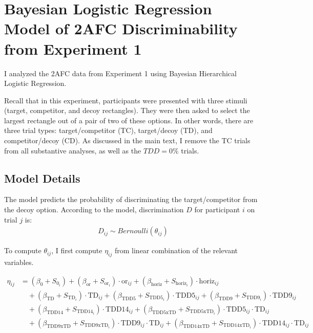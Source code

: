 \chapter{Bayesian Logistic Regression Model of 2AFC Discriminability from Experiment 1}
I analyzed the 2AFC data from Experiment 1 using Bayesian Hierarchical Logistic Regression. 

Recall that in this experiment, participants were presented with three stimuli (target, competitor, and decoy rectangles). They were then asked to select the largest rectangle out of a pair of two of these options. In other words, there are three trial types: target/competitor (TC), target/decoy (TD), and competitor/decoy (CD). As discussed in the main text, I remove the TC trials from all substantive analyses, as well as the $TDD=0\%$ trials. 

\section{Model Details} 

The model predicts the probability of discriminating the target/competitor from the decoy option. According to the model, discrimination $D$ for participant $i$ on trial $j$ is:
\begin{align}
    D_{ij} \sim Bernoulli(\theta_{ij})
\end{align}

To compute $\theta_{ij}$, I first compute $\eta_{ij}$ from linear combination of the relevant variables.

\begin{equation}
    \begin{aligned}
        \eta_{ij} &= (\beta_{0} + S_{0_{i}}) + (\beta_{\mathrm{or}} + S_{\mathrm{or}_{i}}) \cdot \mathrm{or}_{ij} + (\beta_{\mathrm{horiz}} + S_{\mathrm{horiz}_{i}}) \cdot \mathrm{horiz}_{ij} \\
        &\quad + (\beta_{\mathrm{TD}} + S_{\mathrm{TD}_{i}}) \cdot \mathrm{TD}_{ij} + (\beta_{\mathrm{TDD5}} + S_{\mathrm{TDD5}_{i}}) \cdot \mathrm{TDD5}_{ij} + (\beta_{\mathrm{TDD9}} + S_{\mathrm{TDD9}_{i}}) \cdot \mathrm{TDD9}_{ij} \\
        &\quad + (\beta_{\mathrm{TDD14}} + S_{\mathrm{TDD14}_{i}}) \cdot \mathrm{TDD14}_{ij} + (\beta_{\mathrm{TDD5xTD}} + S_{\mathrm{TDD5xTD}_{i}}) \cdot \mathrm{TDD5}_{ij} \cdot \mathrm{TD}_{ij} \\
        &\quad + (\beta_{\mathrm{TDD9xTD}} + S_{\mathrm{TDD9xTD}_{i}}) \cdot \mathrm{TDD9}_{ij} \cdot \mathrm{TD}_{ij} + (\beta_{\mathrm{TDD14xTD}} + S_{\mathrm{TDD14xTD}_{i}}) \cdot \mathrm{TDD14}_{ij} \cdot \mathrm{TD}_{ij}
    \end{aligned}
\end{equation}

